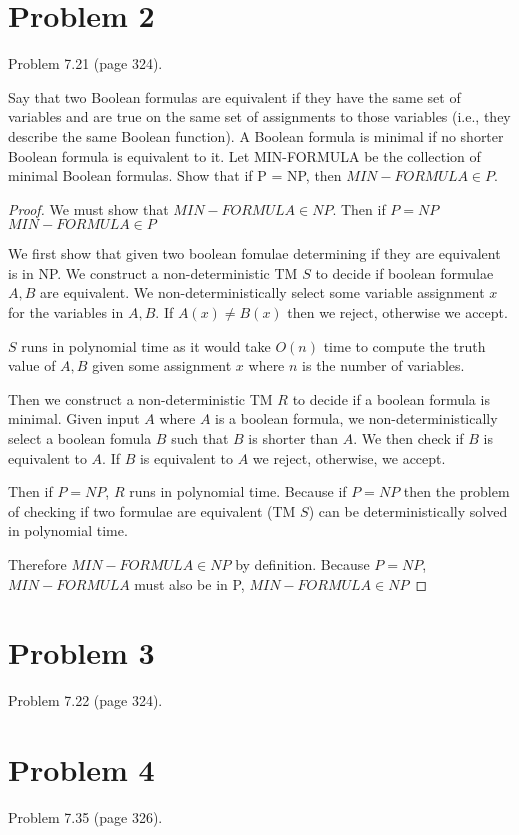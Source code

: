 \documentclass[11pt]{article}
\begin{document}
\newpage
\section*{Problem 2}

Problem 7.21 (page 324).

Say that two Boolean formulas are equivalent if they have the same set of variables
and are true on the same set of assignments to those variables (i.e., they describe
the same Boolean function). A Boolean formula is minimal if no shorter Boolean
formula is equivalent to it. Let MIN-FORMULA be the collection of minimal
Boolean formulas. Show that if P = NP, then $MIN-FORMULA \in P$.


\begin{proof}


We must show that $MIN-FORMULA \in NP$. Then if $P = NP$ $MIN-FORMULA \in P$


We first show that given two boolean fomulae determining if they are equivalent is in NP. We construct a non-deterministic TM $S$ to decide if boolean formulae $A, B$ are equivalent. We non-deterministically select some variable assignment $x$ for the variables in $A, B$. If $A(x) \neq B(x)$ then we reject, otherwise we accept. 

$S$ runs in polynomial time as it would take $O(n)$ time to compute the truth value of $A, B$ given some assignment $x$ where $n$ is the number of variables. 



Then we construct a non-deterministic TM $R$ to decide if a boolean formula is minimal. Given input $A$ where $A$ is a boolean formula, we non-deterministically select a boolean fomula $B$ such that $B$ is shorter than $A$. We then check if $B$ is equivalent to $A$. If $B$ is equivalent to $A$ we reject, otherwise, we accept. 

Then if $P = NP$, $R$ runs in polynomial time. Because if $P = NP$ then the problem of checking if two formulae are equivalent (TM $S$) can be deterministically solved in polynomial time. 

Therefore $MIN-FORMULA \in NP$ by definition. Because $P = NP$, $MIN-FORMULA$ must also be in P, $MIN-FORMULA \in NP$

\end{proof}


\newpage
\section*{Problem 3}

Problem 7.22 (page 324).
\newline


\newpage
\section*{Problem 4}

Problem 7.35 (page 326).
\end{document}
